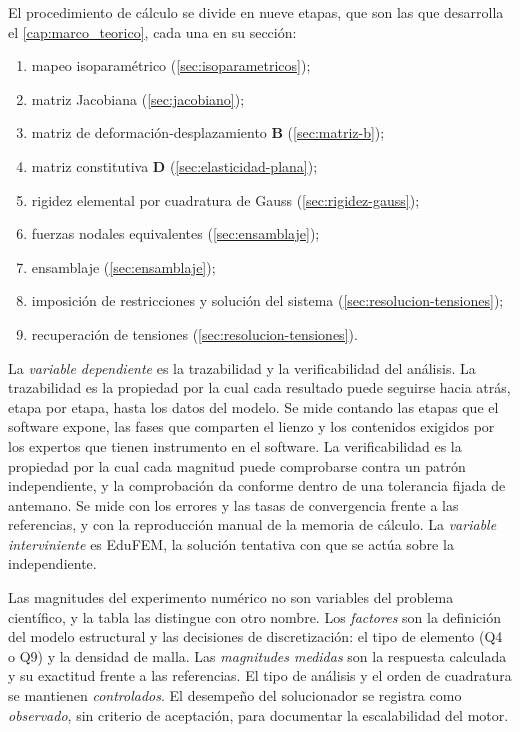 El procedimiento de cálculo se divide en nueve etapas, que son las que desarrolla el \autoref{cap:marco_teorico}, cada una en su sección:
\begin{enumerate}
    \item mapeo isoparamétrico (\autoref{sec:isoparametricos});
    \item matriz Jacobiana (\autoref{sec:jacobiano});
    \item matriz de deformación-desplazamiento $\bm{B}$ (\autoref{sec:matriz-b});
    \item matriz constitutiva $\bm{D}$ (\autoref{sec:elasticidad-plana});
    \item rigidez elemental por cuadratura de Gauss (\autoref{sec:rigidez-gauss});
    \item fuerzas nodales equivalentes (\autoref{sec:ensamblaje});
    \item ensamblaje (\autoref{sec:ensamblaje});
    \item imposición de restricciones y solución del sistema (\autoref{sec:resolucion-tensiones});
    \item recuperación de tensiones (\autoref{sec:resolucion-tensiones}).
\end{enumerate}

La \emph{variable dependiente} es la trazabilidad y la verificabilidad del análisis. La trazabilidad es la propiedad por la cual cada resultado puede seguirse hacia atrás, etapa por etapa, hasta los datos del modelo. Se mide contando las etapas que el software expone, las fases que comparten el lienzo y los contenidos exigidos por los expertos que tienen instrumento en el software. La verificabilidad es la propiedad por la cual cada magnitud puede comprobarse contra un patrón independiente, y la comprobación da conforme dentro de una tolerancia fijada de antemano. Se mide con los errores y las tasas de convergencia frente a las referencias, y con la reproducción manual de la memoria de cálculo. La \emph{variable interviniente} es EduFEM, la solución tentativa con que se actúa sobre la independiente.

Las magnitudes del experimento numérico no son variables del problema científico, y la tabla las distingue con otro nombre. Los \emph{factores} son la definición del modelo estructural y las decisiones de discretización: el tipo de elemento (Q4 o Q9) y la densidad de malla. Las \emph{magnitudes medidas} son la respuesta calculada y su exactitud frente a las referencias. El tipo de análisis y el orden de cuadratura se mantienen \emph{controlados}. El desempeño del solucionador se registra como \emph{observado}, sin criterio de aceptación, para documentar la escalabilidad del motor.

